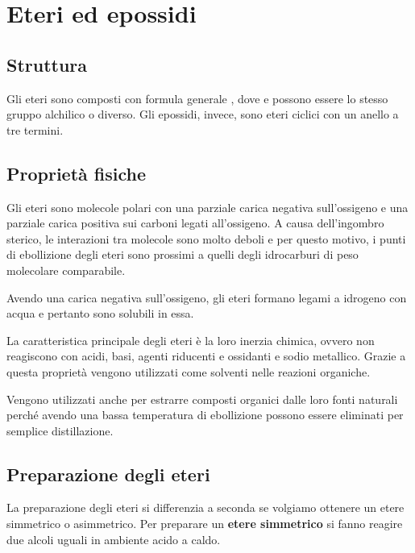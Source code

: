 \chapter{Eteri ed epossidi}
\section{Struttura}
Gli eteri sono composti con formula generale , dove  e  possono essere lo stesso gruppo alchilico o diverso. Gli epossidi, invece, sono eteri ciclici con un anello a tre termini.

\section{Proprietà fisiche}
Gli eteri sono molecole polari con una parziale carica negativa sull'ossigeno e una parziale carica positiva sui carboni legati all'ossigeno. A causa dell'ingombro sterico, le interazioni tra molecole sono molto deboli e per questo motivo, i punti di ebollizione degli eteri sono prossimi a quelli degli idrocarburi di peso molecolare comparabile.

Avendo una carica negativa sull'ossigeno, gli eteri formano legami a idrogeno con acqua e pertanto sono solubili in essa.

La caratteristica principale degli eteri è la loro inerzia chimica, ovvero non reagiscono con acidi, basi, agenti riducenti e ossidanti e sodio metallico. Grazie a questa proprietà vengono utilizzati come solventi nelle reazioni organiche.

Vengono utilizzati anche per estrarre composti organici dalle loro fonti naturali perché avendo una bassa temperatura di ebollizione possono essere eliminati per semplice distillazione.

\section{Preparazione degli eteri}
La preparazione degli eteri si differenzia a seconda se volgiamo ottenere un etere simmetrico o asimmetrico. Per preparare un \textbf{etere simmetrico} si fanno reagire due alcoli uguali in ambiente acido a caldo.
\begin{reaction}
\end{reaction}

